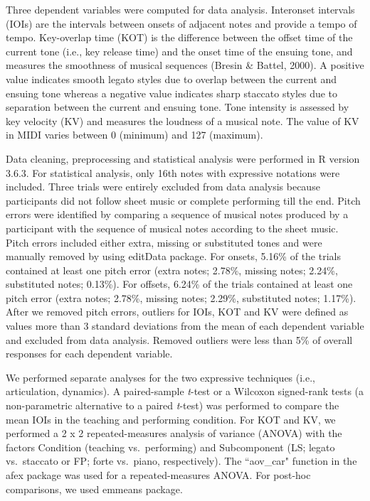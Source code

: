 \documentclass[
  english,
  man,floatsintext]{apa6}
\begin{document}
Three dependent variables were computed for data analysis. Interonset intervals (IOIs) are the intervals between onsets of adjacent notes and provide a tempo of tempo. Key-overlap time (KOT) is the difference between the offset time of the current tone (i.e., key release time) and the onset time of the ensuing tone, and measures the smoothness of musical sequences (Bresin \& Battel, 2000). A positive value indicates smooth legato styles due to overlap between the current and ensuing tone whereas a negative value indicates sharp staccato styles due to separation between the current and ensuing tone. Tone intensity is assessed by key velocity (KV) and measures the loudness of a musical note. The value of KV in MIDI varies between 0 (minimum) and 127 (maximum).

Data cleaning, preprocessing and statistical analysis were performed in R version 3.6.3. For statistical analysis, only 16th notes with expressive notations were included. Three trials were entirely excluded from data analysis because participants did not follow sheet music or complete performing till the end. Pitch errors were identified by comparing a sequence of musical notes produced by a participant with the sequence of musical notes according to the sheet music. Pitch errors included either extra, missing or substituted tones and were manually removed by using editData package. For onsets, 5.16\% of the trials contained at least one pitch error (extra notes; 2.78\%, missing notes; 2.24\%, substituted notes; 0.13\%). For offsets, 6.24\% of the trials contained at least one pitch error (extra notes; 2.78\%, missing notes; 2.29\%, substituted notes; 1.17\%). After we removed pitch errors, outliers for IOIs, KOT and KV were defined as values more than 3 standard deviations from the mean of each dependent variable and excluded from data analysis. Removed outliers were less than 5\% of overall responses for each dependent variable.

We performed separate analyses for the two expressive techniques (i.e., articulation, dynamics). A paired-sample \emph{t}-test or a Wilcoxon signed-rank tests (a non-parametric alternative to a paired \emph{t}-test) was performed to compare the mean IOIs in the teaching and performing condition. For KOT and KV, we performed a 2 x 2 repeated-measures analysis of variance (ANOVA) with the factors Condition (teaching vs.~performing) and Subcomponent (LS; legato vs.~staccato or FP; forte vs.~piano, respectively). The ``aov\_car" function in the afex package was used for a repeated-measures ANOVA. For post-hoc comparisons, we used emmeans package.
\end{document}
